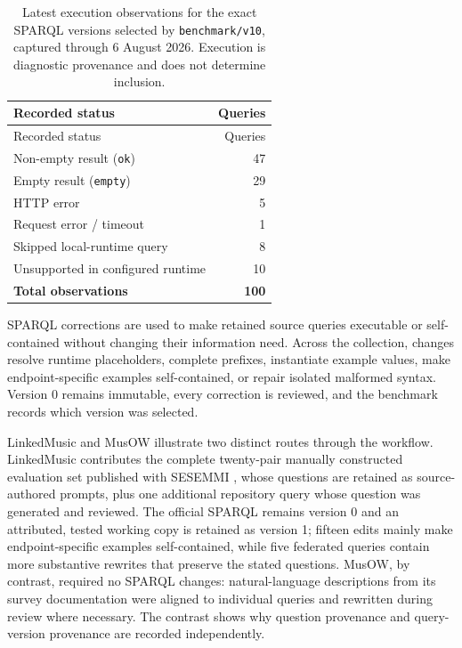 \begin{longtable}[]{@{}lr@{}}
\caption{Latest execution observations for the exact SPARQL versions selected by \protect\texttt{benchmark/v10}, captured through 6 August 2026. Execution is diagnostic provenance and does not determine inclusion.}\tabularnewline
\toprule\noalign{}
Recorded status & Queries \\
\midrule\noalign{}
\endfirsthead
\toprule\noalign{}
Recorded status & Queries \\
\midrule\noalign{}
\endhead
\bottomrule\noalign{}
\endlastfoot
Non-empty result (\texttt{ok}) & 47 \\
Empty result (\texttt{empty}) & 29 \\
HTTP error & 5 \\
Request error / timeout & 1 \\
Skipped local-runtime query & 8 \\
Unsupported in configured runtime & 10 \\
\textbf{Total observations} & \textbf{100} \\
\end{longtable}

SPARQL corrections are used to make retained source queries executable or self-contained without changing their information need. Across the collection, changes resolve runtime placeholders, complete prefixes, instantiate example values, make endpoint-specific examples self-contained, or repair isolated malformed syntax. Version 0 remains immutable, every correction is reviewed, and the benchmark records which version was selected.

LinkedMusic and MusOW illustrate two distinct routes through the workflow. LinkedMusic contributes the complete twenty-pair manually constructed evaluation set published with SESEMMI \citep{pond2025sesemmi}, whose questions are retained as source-authored prompts, plus one additional repository query whose question was generated and reviewed. The official SPARQL remains version 0 and an attributed, tested working copy is retained as version 1; fifteen edits mainly make endpoint-specific examples self-contained, while five federated queries contain more substantive rewrites that preserve the stated questions. MusOW, by contrast, required no SPARQL changes: natural-language descriptions from its survey documentation were aligned to individual queries and rewritten during review where necessary. The contrast shows why question provenance and query-version provenance are recorded independently.

